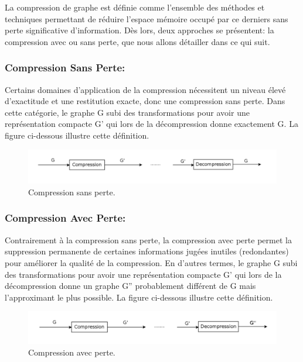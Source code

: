 La compression de graphe est définie comme l'ensemble des méthodes et techniques permettant de réduire l'espace mémoire occupé par ce derniers sans perte significative d'information. Dès lors, deux approches se présentent: la compression avec ou sans perte, que nous allons détailler dans ce qui suit.
			
			\subsubsection{Compression Sans Perte:}
			Certains domaines d'application de la compression nécessitent un niveau élevé d'exactitude et une restitution exacte, donc une compression sans perte. Dans cette catégorie, le graphe G subi des transformations pour avoir une représentation compacte G' qui lors de la décompression donne exactement G. La figure ci-dessous illustre cette définition. 
			
			\begin{figure}[h]
			\includegraphics[scale=0.15,center]{./ressources/image/SansPerte.png}
			\caption[Compression sans perte.]{Compression sans perte.}
			\end{figure}
			
			
			\subsubsection{Compression Avec Perte:}
			Contrairement à la compression sans perte, la compression avec perte permet la suppression permanente de certaines informations jugées inutiles (redondantes) pour améliorer la qualité de la compression.  En d'autres termes, le graphe G subi des transformations pour avoir une représentation compacte G' qui lors de la décompression donne un graphe G'' probablement différent de G mais l'approximant le plus possible. La figure ci-dessous illustre cette définition.   
			
			\begin{figure}[h]
			\includegraphics[scale=0.15,center]{./ressources/image/AvecPerte.png}
			\caption[Compression avec perte.]{Compression avec perte.}
			\end{figure}
			

